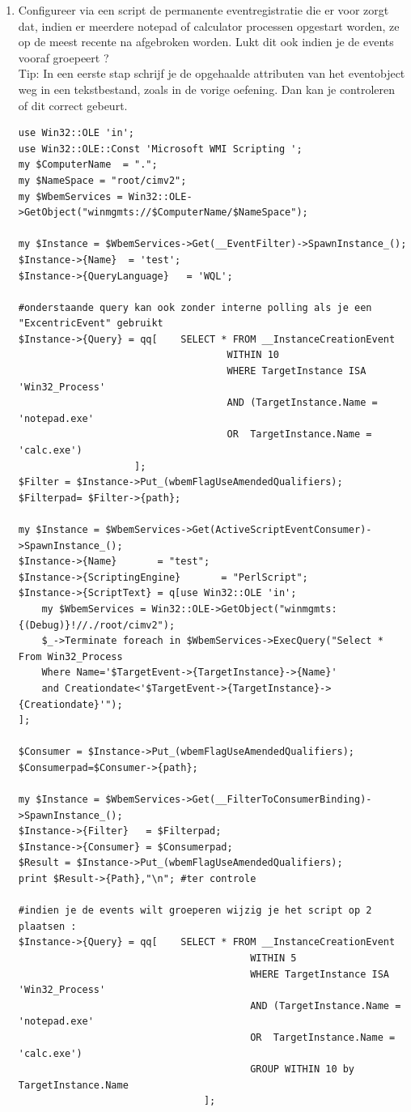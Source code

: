 \documentclass[11pt,a4paper]{report}
\begin{document}
\begin{enumerate}[resume]
	\item Configureer via een script de permanente eventregistratie die er voor zorgt dat, indien er meerdere notepad of calculator processen opgestart worden, ze op de meest recente na afgebroken worden. Lukt dit ook indien je de events vooraf groepeert ?
	\\Tip: In een eerste stap schrijf je de opgehaalde attributen van het eventobject weg in een tekstbestand, zoals in de vorige oefening. Dan kan je controleren of dit correct gebeurt.
	\begin{lstlisting}
use Win32::OLE 'in';
use Win32::OLE::Const 'Microsoft WMI Scripting ';
my $ComputerName  = ".";
my $NameSpace = "root/cimv2";
my $WbemServices = Win32::OLE->GetObject("winmgmts://$ComputerName/$NameSpace");

my $Instance = $WbemServices->Get(__EventFilter)->SpawnInstance_();
$Instance->{Name}  = 'test';
$Instance->{QueryLanguage}   = 'WQL';

#onderstaande query kan ook zonder interne polling als je een "ExcentricEvent" gebruikt
$Instance->{Query} = qq[ 	SELECT * FROM __InstanceCreationEvent
									WITHIN 10
									WHERE TargetInstance ISA 'Win32_Process'
									AND (TargetInstance.Name = 'notepad.exe'
									OR  TargetInstance.Name = 'calc.exe') 
					];
$Filter = $Instance->Put_(wbemFlagUseAmendedQualifiers);
$Filterpad= $Filter->{path};

my $Instance = $WbemServices->Get(ActiveScriptEventConsumer)->SpawnInstance_();
$Instance->{Name}       = "test";
$Instance->{ScriptingEngine}       = "PerlScript";
$Instance->{ScriptText} = q[use Win32::OLE 'in';
	my $WbemServices = Win32::OLE->GetObject("winmgmts:{(Debug)}!//./root/cimv2");
	$_->Terminate foreach in $WbemServices->ExecQuery("Select * From Win32_Process
	Where Name='$TargetEvent->{TargetInstance}->{Name}'
	and Creationdate<'$TargetEvent->{TargetInstance}->{Creationdate}'"); 
];

$Consumer = $Instance->Put_(wbemFlagUseAmendedQualifiers);
$Consumerpad=$Consumer->{path};

my $Instance = $WbemServices->Get(__FilterToConsumerBinding)->SpawnInstance_();
$Instance->{Filter}   = $Filterpad;
$Instance->{Consumer} = $Consumerpad;
$Result = $Instance->Put_(wbemFlagUseAmendedQualifiers);
print $Result->{Path},"\n"; #ter controle

#indien je de events wilt groeperen wijzig je het script op 2 plaatsen :
$Instance->{Query} = qq[ 	SELECT * FROM __InstanceCreationEvent
										WITHIN 5
										WHERE TargetInstance ISA 'Win32_Process'
										AND (TargetInstance.Name = 'notepad.exe'
										OR  TargetInstance.Name = 'calc.exe') 
										GROUP WITHIN 10 by TargetInstance.Name
								];


\end{lstlisting}
\end{enumerate}
\end{document}
